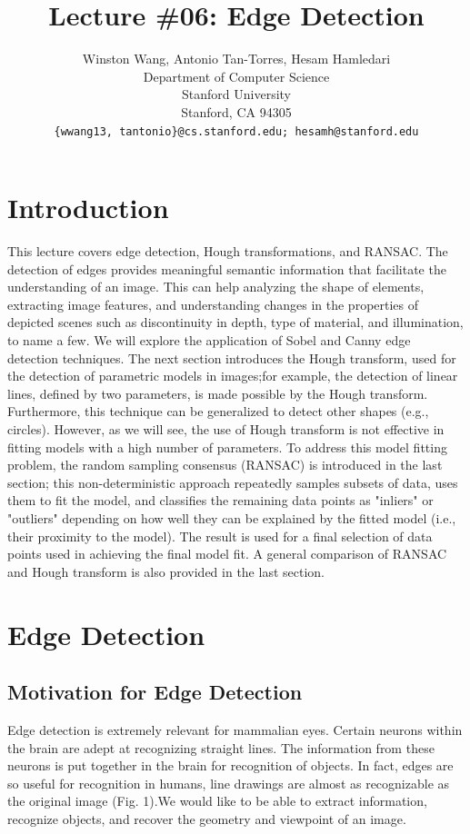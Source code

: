 \documentclass{article}
\title{Lecture \#06: Edge Detection}
\author{
  Winston Wang, Antonio Tan-Torres, Hesam Hamledari \\
  Department of Computer Science\\
  Stanford University\\
  Stanford, CA 94305 \\
  \texttt{\{wwang13, tantonio\}@cs.stanford.edu; hesamh@stanford.edu} \\
}
\begin{document}
\maketitle
\section{Introduction}
This lecture covers edge detection, Hough transformations, and RANSAC.
The detection of edges provides meaningful semantic information that facilitate the understanding of an image. This can help analyzing the shape of elements, extracting image features, and understanding changes in the properties of depicted scenes such as discontinuity in depth, type of material, and illumination, to name a few. We will explore the application of Sobel and Canny edge detection techniques.
The next section introduces the Hough transform, used for the detection of parametric models in images;for example, the detection of linear lines, defined by two parameters, is made possible by the Hough transform. Furthermore, this technique can be generalized to detect other shapes (e.g., circles).
However, as we will see, the use of Hough transform is not effective in fitting models with a high number of parameters. To address this model fitting problem, the random sampling consensus (RANSAC) is introduced in the last section; this non-deterministic approach repeatedly samples subsets of data, uses them to fit the model, and classifies the remaining data points as "inliers" or "outliers" depending on how well they can be explained by the fitted model (i.e., their proximity to the model). The result is used for a final selection of data points used in achieving the final model fit. A general comparison of RANSAC and Hough transform is also provided in the last section.

\section{Edge Detection}
\subsection{Motivation for Edge Detection}
Edge detection is extremely relevant for mammalian eyes.  Certain neurons within the brain are adept at recognizing straight lines.  The information from these neurons is put together in the brain for recognition of objects.  In fact, edges are so useful for recognition in humans, line drawings are almost as recognizable as the original image (Fig. 1).We would like to be able to extract information, recognize objects, and recover the geometry and viewpoint of an image.
\end{document}
